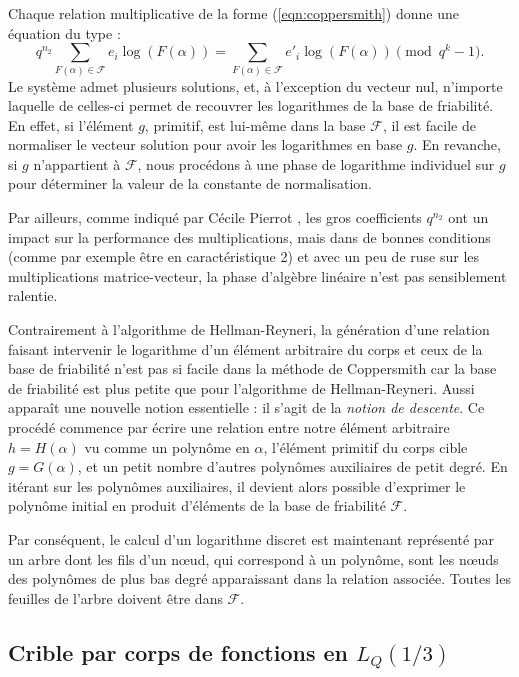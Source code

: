 \documentclass[a4paper, titlepage, 11pt]{article}
\theoremstyle{definition}
\theoremstyle{remark}
\begin{document}
Chaque relation multiplicative de la forme (\ref{eqn:coppersmith}) donne une équation du type :
$$q^{n_2} \sum_{F(\alpha) \in \mathcal{F}} e_i \log(F(\alpha)) = \sum_{F(\alpha) \in \mathcal{F}} e'_i \log(F(\alpha)) \pmod{q^k-1}.$$
Le système admet plusieurs solutions, et, à l'exception du vecteur nul, n'importe laquelle de celles-ci permet de recouvrer les logarithmes de la base de friabilité. En effet, si l'élément $g$, primitif, est lui-même dans la base $\mathcal{F}$, il est facile de normaliser le vecteur solution pour avoir les logarithmes en base $g$. En revanche, si $g$ n'appartient à $\mathcal{F}$, nous procédons à une phase de logarithme individuel sur $g$ pour déterminer la valeur de la constante de normalisation.

Par ailleurs, comme indiqué par Cécile Pierrot \cite{pierrot2016}, les gros coefficients $q^{n_2}$ ont un impact sur la performance des multiplications, mais dans de bonnes conditions (comme par exemple être en caractéristique 2) et avec un peu de ruse sur les multiplications matrice-vecteur, la phase d'algèbre linéaire n'est pas sensiblement ralentie.

Contrairement à l'algorithme de Hellman-Reyneri, la génération d'une relation faisant intervenir le logarithme d'un élément arbitraire du corps et ceux de la base de friabilité n'est pas si facile dans la méthode de Coppersmith car la base de friabilité est plus petite que pour l'algorithme de Hellman-Reyneri. Aussi apparaît une nouvelle notion essentielle : il s'agit de la \textit{notion de descente}. Ce procédé commence par écrire une relation entre notre élément arbitraire $h = H(\alpha)$ vu comme un polynôme en $\alpha$, l'élément primitif du corps cible $g = G(\alpha)$, et un petit nombre d'autres polynômes auxiliaires de petit degré. En itérant sur les polynômes auxiliaires, il devient alors possible d'exprimer le polynôme initial en produit d'éléments de la base de friabilité $\mathcal{F}$.

Par conséquent, le calcul d'un logarithme discret est maintenant représenté par un arbre dont les fils d'un n\oe ud, qui correspond à un polynôme, sont les n\oe uds des polynômes de plus bas degré apparaissant dans la relation associée. Toutes les feuilles de l'arbre doivent être dans $\mathcal{F}$.

\subsection{Crible par corps de fonctions en $L_Q(1/3)$}
\end{document}
